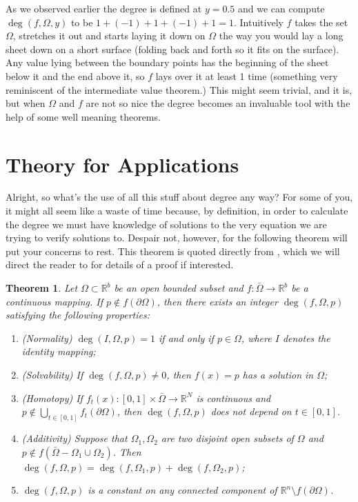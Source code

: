 \documentclass[11pt]{article}
\theoremstyle{plain}
\newtheorem{thm}{Theorem}[section]
\theoremstyle{definition}
\theoremstyle{remark}
\begin{document}
As we observed earlier the degree is defined at $y=0.5$ and we can compute $\operatorname{deg}\left(f,\Omega,y\right)$ to be $1+(-1)+1+(-1)+1=1$. Intuitively $f$ takes the set $\Omega$, stretches it out and starts laying it down on $\Omega$ the way you would lay a long sheet down on a short surface (folding back and forth so it fits on the surface). Any value lying between the boundary points has the beginning of the sheet below it and the end above it, so $f$ lays over it at least 1 time (something very reminiscent of the intermediate value theorem.)
This might seem trivial, and it is, but when $\Omega$ and $f$ are not so nice the degree becomes an invaluable tool with the help of some well meaning theorems.

  


\section{Theory for Applications}

Alright, so what's the use of all this stuff about degree any way? For some of you, it might all seem like a waste of time because, by definition, in order to calculate the degree we must have knowledge of solutions to the very equation we are trying to verify solutions to. Despair not, however, for the following theorem will put your concerns to rest. 
This theorem is quoted directly from \cite{OrChCh2006}, which we will direct the reader to for details of a proof if interested. 

\begin{thm} \label{DegThm}
Let $\Omega\subset\mathbb{R}^b$ be an open bounded subset and $f:\bar{\Omega}\rightarrow\mathbb{R}^b$ be a continuous mapping. If $p\not\in f\left(\partial\Omega\right)$, then there exists an integer $\operatorname{deg}\left(f, \Omega,p\right)$ satisfying the following properties:
\begin{enumerate}
\item (Normality) $\operatorname{deg}\left(I, \Omega,p\right)=1$ if and only if $p\in\Omega$, where $I$ denotes the identity mapping;
\item (Solvability) If $\operatorname{deg}\left(f, \Omega,p\right)\not= 0$, then $f(x)=p$ has a solution in $\Omega$;
\item (Homotopy) If $f_t(x):[0,1]\times\bar{\Omega}\rightarrow\mathbb{R}^N$ is continuous and $p\not\in \bigcup\limits_{t\in[0,1]}f_t\left(\partial\Omega\right)$, then $\operatorname{deg}\left(f, \Omega,p\right)$ does not depend on $t\in[0,1]$. 
\item (Additivity) Suppose that $\Omega_1, \Omega_2$ are two disjoint open subsets of $\Omega$ and $p\not\in f\left(\bar{\Omega}-\Omega_1\cup\Omega_2\right)$. Then $\operatorname{deg}\left(f, \Omega,p\right)=\operatorname{deg}\left(f, \Omega_1,p\right)+\operatorname{deg}\left(f, \Omega_2,p\right)$;
\item $\operatorname{deg}\left(f, \Omega,p\right)$ is a constant on any connected component of $\mathbb{R}^n\setminus f(\partial\Omega)$. 
\end{enumerate}
\end{thm}
\end{document}

